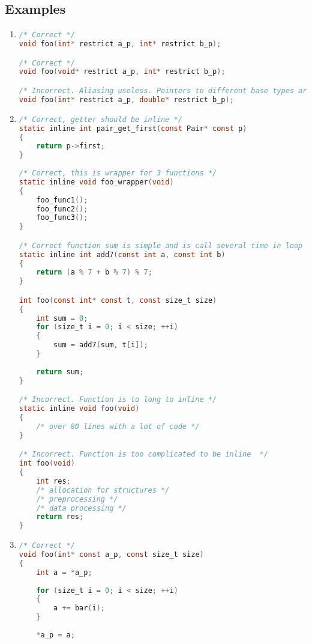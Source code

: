 \subsection{Examples}
\begin{enumerate}
    \item 
\begin{lstlisting}[language=C,style=C99]
/* Correct */
void foo(int* restrict a_p, int* restrict b_p);

/* Correct */
void foo(void* restrict a_p, int* restrict b_p);

/* Incorrect. Aliasing useless. Pointers to different base types are not supposed to alias */
void foo(int* restrict a_p, double* restrict b_p);
\end{lstlisting}

    \item
\begin{lstlisting}[language=C,style=C99]
/* Correct, getter should be inline */
static inline int pair_get_first(const Pair* const p)
{
    return p->first;
}
    
/* Correct, this is wrapper for 3 functions */
static inline void foo_wrapper(void)
{
    foo_func1();
    foo_func2();
    foo_func3();
}

/* Correct function sum is simple and is call several time in loop */
static inline int add7(const int a, const int b)
{
    return (a % 7 + b % 7) % 7;
}

int foo(const int* const t, const size_t size)
{
    int sum = 0;
    for (size_t i = 0; i < size; ++i)
    {
        sum = add7(sum, t[i]);
    }
    
    return sum;
}

/* Incorrect. Function is to long to inline */
static inline void foo(void)
{
    /* over 80 lines with a lot of code */
}

/* Incorrect. Function is too complicated to be inline  */
int foo(void)
{
    int res;
    /* allocation for structures */
    /* preprocessing */
    /* data processing */
    return res;
}
\end{lstlisting}
    
    \item 
\begin{lstlisting}[language=C,style=C99]
/* Correct */
void foo(int* const a_p, const size_t size)
{
    int a = *a_p;
    
    for (size_t i = 0; i < size; ++i)
    {
        a += bar(i);
    }
    
    *a_p = a;
    

\end{lstlisting}
\end{enumerate}
